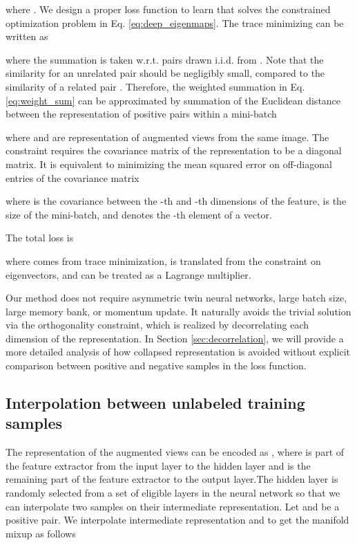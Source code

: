 \documentclass{article}
\begin{document}
where . We design a proper loss function to learn  that solves the constrained optimization problem in Eq. \eqref{eq:deep_eigenmaps}.
The trace minimizing can be written as 

where the summation is taken w.r.t. pairs  drawn i.i.d. from .  Note that the similarity  for an unrelated pair  should be negligibly small, compared to the similarity of a related pair . Therefore, the weighted summation in Eq. \eqref{eq:weight_sum} can be approximated by summation of the Euclidean distance between the representation of positive pairs within a mini-batch 
 
where  and  are representation of augmented views from the same image. 
The constraint  requires the covariance matrix of the representation to be a diagonal matrix. It is equivalent to minimizing the mean squared error on off-diagonal entries of the covariance matrix

where  is the covariance between the -th and -th dimensions of the feature,  is the size of the mini-batch, and  denotes the -th element of a vector.

The total loss is 

where  comes from trace minimization,  is translated from the constraint on eigenvectors, and  can be treated as a Lagrange multiplier.

Our method does not require asymmetric twin neural networks, large batch size, large memory bank, or momentum update.  It naturally avoids the trivial solution via the orthogonality constraint, which is realized by decorrelating each dimension of the representation. In Section \ref{sec:decorrelation}, we will provide a more detailed analysis of how collapsed representation is avoided without explicit comparison between positive and negative samples in the loss function.

\subsection{Interpolation between unlabeled training samples}
The representation of the augmented views can be encoded as , where  is part of the feature extractor from the input layer to the hidden layer  and  is the remaining part of the feature extractor to the output layer.The hidden layer  is randomly selected from a set of eligible layers in the neural network  so that we can interpolate two samples on their intermediate representation. Let  and  be a positive pair. We interpolate intermediate representation  and  to get the manifold mixup \citep{verma:etal:2019manifold} as follows
\end{document}
